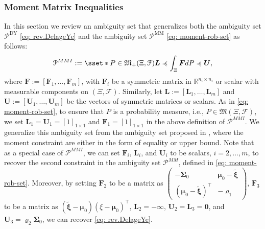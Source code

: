 \documentclass[final,onefignum,onetabnum]{class}
\newcommand{\bs}[1]{\boldsymbol{#1}} %
\newcommand{\Bs}[1]{\mathbb{#1}} %
\newcommand{\Cs}[1]{\mathcal{#1}} %
\newcommand{\Fs}[1]{\mathfrak{#1}} %
\newcommand{\txi}{\tilde{\bs{\xi}}}
\newcommand{\measurespace}{\left( \Xi, \Cs{F} \right)}
\newcommand{\M}{\Fs{M}_{+}(\Xi,\Cs{F})}
\begin{document}
\subsubsection{Moment Matrix Inequalities}


In this section we review an ambiguity set that generalizes both the ambiguity set $\Cs{P}^{\text{DY}}$ \eqref{eq: rev.DelageYe} and the ambiguity set $\Cs{P}^{\text{MM}}$ \eqref{eq: moment-rob-set} as follows:
\begin{equation}
\label{eq: rev.MMI}
\Cs{P}^{MMI}:=\sset*{P\in\M}{ \bs{L} \preccurlyeq \int_{\Xi} \bs{F} d P \preccurlyeq \bs{U}},
\end{equation}
where $\bs{F}:=[\bs{F}_1,\ldots,\bs{F}_m]$, with $\bs{F}_{i}$ be a symmetric matrix in $\Bs{R}^{n_{i} \times n_{i}}$ or scalar with measurable components on $\measurespace$. Similarly, let $\bs{L}:=[\bs{L}_1,\ldots,\bs{L}_m]$ and $\bs{U}:=[\bs{U}_1,\ldots,\bs{U}_m]$ be the vectors of symmetric matrices or scalars. 
As in \eqref{eq: moment-rob-set}, to ensure that $P$ is a probability measure, i.e., $P \in \Fs{M}\measurespace$, we set $\bs{L}_1=\bs{U}_{1}= [1]_{1 \times 1}$ and $\bs{F}_1=[1]_{1 \times 1}$ in the above definition of $\Cs{P}^{MMI}$. 
We generalize this ambiguity set from the ambiguity set proposed in \citet{xu2018matrix}, where the moment constraint are either in the form of equality or upper bound.  Note that as a special case of $\Cs{P}^{MMI}$, we can set  $\bs{F}_{i}$, $\bs{L}_{i}$, and $\bs{U}_{i}$ to be scalars, $i=2, \ldots, m$, to recover the second constraint in the ambiguity set $\Cs{P}^{MM}$, defined in \eqref{eq: moment-rob-set}. 
Moreover, by setting $\bs{F}_{2}$ to be a matrix as $\begin{pmatrix}
    -\bs{\Sigma}_{0}       & \bs{\mu}_{0} -\txi \\
    (\bs{\mu}_{0} -\txi)^{\top} & -\varrho_{1}
\end{pmatrix}$, $\bs{F}_{3}$ to be a matrix as $(\txi-\bs{\mu}_{0})(\xi-\bs{\mu}_{0})^{\top}$, $\bs{L}_{2}=-\bs{\infty}$, $\bs{U}_{2}=\bs{L}_{3}= \bs{0}$, and $\bs{U}_{3}=\varrho_{2} \bs{\Sigma}_{0}$, we can recover \eqref{eq: rev.DelageYe}. 
\end{document}
